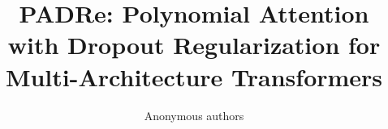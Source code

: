\title{\textbf{PADRe: Polynomial Attention with Dropout Regularization for Multi-Architecture Transformers}}

\author{Anonymous authors}

